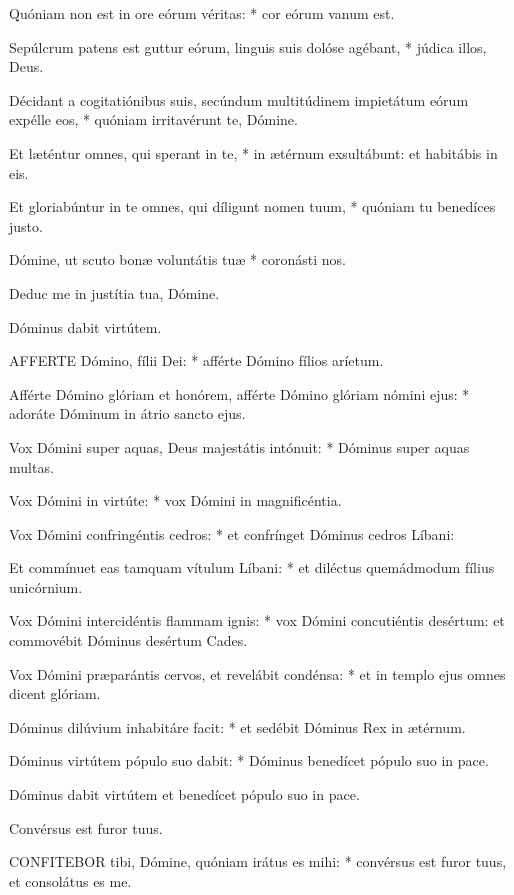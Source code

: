 Quóniam non est in ore eórum véritas: * cor eórum vanum est.

Sepúlcrum patens est guttur eórum, linguis suis dolóse agébant, * júdica illos, Deus.

Décidant a cogitatiónibus suis, secúndum multitúdinem impietátum eórum expélle eos, * quóniam irritavérunt te, Dómine.

Et læténtur omnes, qui sperant in te, * in ætérnum exsultábunt: et habitábis in eis.

Et gloriabúntur in te omnes, qui díligunt nomen tuum, * quóniam tu benedíces justo.

Dómine, ut scuto bonæ voluntátis tuæ * coronásti nos.

 Deduc me in justítia tua, Dómine.

 Dóminus dabit virtútem.


\lettrine[lines=2]{A}{FFERTE} Dómino, fílii Dei: * afférte Dómino fílios aríetum.

Afférte Dómino glóriam et honórem, afférte Dómino glóriam nómini ejus: * adoráte Dóminum in átrio sancto ejus.

Vox Dómini super aquas, Deus majestátis intónuit: * Dóminus super aquas multas.

Vox Dómini in virtúte: * vox Dómini in magnificéntia.

Vox Dómini confringéntis cedros: * et confrínget Dóminus cedros Líbani:

Et commínuet eas tamquam vítulum Líbani: * et diléctus quemádmodum fílius unicórnium.

Vox Dómini intercidéntis flammam ignis: * vox Dómini concutiéntis desértum: et commovébit Dóminus desértum Cades.

Vox Dómini præparántis cervos, et revelábit condénsa: * et in templo ejus omnes dicent glóriam.

Dóminus dilúvium inhabitáre facit: * et sedébit Dóminus Rex in ætérnum.

Dóminus virtútem pópulo suo dabit: * Dóminus benedícet pópulo suo in pace.

 Dóminus dabit virtútem et benedícet pópulo suo in pace.

 Convérsus est furor tuus.


\lettrine[lines=2]{C}{ONFITEBOR} tibi, Dómine, quóniam irátus es mihi: * convérsus est furor tuus, et consolátus es me.

